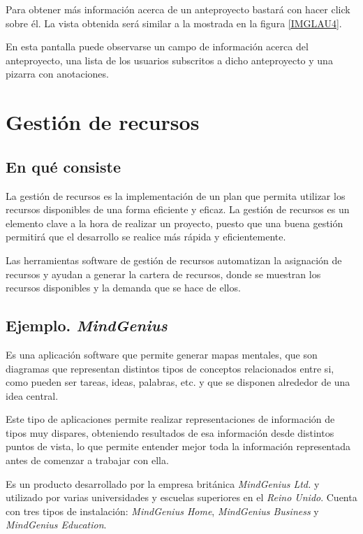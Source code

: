 \documentclass[11pt,a4paper,spanish,twoside]{report}
\begin{document}
	Para obtener más información acerca de un anteproyecto bastará con hacer
	click sobre él. La vista obtenida será similar a la mostrada en la figura
	\ref{IMGLAU4}.
		

	En esta pantalla puede observarse un campo de información acerca del
	anteproyecto, una lista de los usuarios subscritos a dicho anteproyecto y
	una pizarra con anotaciones.

\chapter{Gestión de recursos}
\section{En qué consiste}
La gestión de recursos es la implementación de un plan que permita utilizar
los recursos disponibles de una forma eficiente y eficaz. La gestión de
recursos es un elemento clave a la hora de realizar un proyecto, puesto que
una buena gestión permitirá que el desarrollo se realice más rápida y
eficientemente.

Las herramientas software de gestión de recursos automatizan la asignación de
recursos y ayudan a generar la cartera de recursos, donde se muestran los
recursos disponibles y la demanda que se hace de ellos.

\section{Ejemplo. \emph{MindGenius}}
Es una aplicación software que permite generar mapas mentales, que son
diagramas que representan distintos tipos de conceptos relacionados entre si,
como pueden ser tareas, ideas, palabras, etc. y que se disponen alrededor de
una idea central.

Este tipo de aplicaciones permite realizar representaciones de información de
tipos muy dispares, obteniendo resultados de esa información desde distintos
puntos de vista, lo que permite entender mejor toda la información
representada antes de comenzar a trabajar con ella.

Es un producto desarrollado por la empresa británica \emph{MindGenius Ltd.} y
utilizado por varias universidades y escuelas superiores en el \emph{Reino
  Unido}. Cuenta con tres tipos de instalación: \emph{MindGenius Home},
\emph{MindGenius Business} y \emph{MindGenius Education}. 
\end{document}
